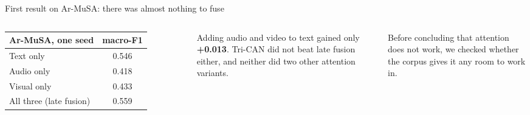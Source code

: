 \documentclass[aspectratio=169,10pt]{beamer}
\begin{document}
\begin{frame}[t]{First result on Ar-MuSA: there was almost nothing to fuse}
\begin{columns}[T,onlytextwidth]
\centering
\begin{tabular}{@{}lc@{}}
\toprule
Ar-MuSA, one seed & macro-F1 \\
\midrule
Text only   & 0.546 \\
Audio only  & 0.418 \\
Visual only & 0.433 \\
All three (late fusion) & 0.559 \\
\bottomrule
\end{tabular}

\vspace{0.4cm}
\raggedright
Adding audio and video to text gained only \textbf{+0.013}.
Tri-CAN did not beat late fusion either, and neither did two other attention variants.

\vspace{0.3cm}
Before concluding that attention does not work, we checked whether the corpus
gives it any room to work in.
\end{columns}
\end{frame}
\end{document}
